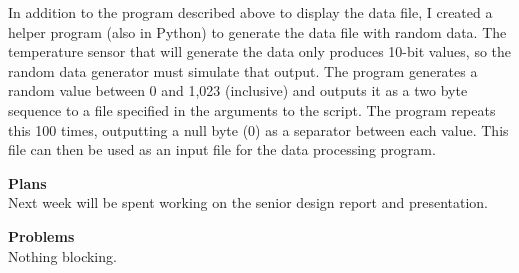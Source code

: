 In addition to the program described above to display the data file, I created
a helper program (also in Python) to generate the data file with random data. 
The temperature sensor that will generate the data only produces 10-bit 
values, so the random data generator must simulate that output. The program 
generates a random value between 0 and 1,023 (inclusive) and outputs it as a 
two byte sequence to a file specified in the arguments to the script. The 
program repeats this 100 times, outputting a null byte (0) as a separator 
between each value. This file can then be used as an input file for the data 
processing program.

\textbf{Plans} \\
Next week will be spent working on the senior design report and presentation. 

\textbf{Problems} \\
Nothing blocking. 
